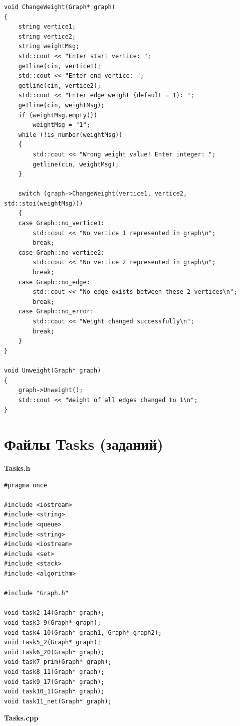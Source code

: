 \documentclass[otchet]{SCWorks}
\begin{document}
\begin{verbatim}
void ChangeWeight(Graph* graph)
{
	string vertice1;
	string vertice2;
	string weightMsg;
	std::cout << "Enter start vertice: ";
	getline(cin, vertice1);
	std::cout << "Enter end vertice: ";
	getline(cin, vertice2);
	std::cout << "Enter edge weight (default = 1): ";
	getline(cin, weightMsg);
	if (weightMsg.empty())
		weightMsg = "1";
	while (!is_number(weightMsg))
	{
		std::cout << "Wrong weight value! Enter integer: ";
		getline(cin, weightMsg);
	}

	switch (graph->ChangeWeight(vertice1, vertice2, std::stoi(weightMsg)))
	{
	case Graph::no_vertice1:
		std::cout << "No vertice 1 represented in graph\n";
		break;
	case Graph::no_vertice2:
		std::cout << "No vertice 2 represented in graph\n";
		break;
	case Graph::no_edge:
		std::cout << "No edge exists between these 2 vertices\n";
		break;
	case Graph::no_error:
		std::cout << "Weight changed successfully\n";
		break;
	}
}

void Unweight(Graph* graph)
{
	graph->Unweight();
	std::cout << "Weight of all edges changed to 1\n";
}
\end{verbatim}

\section{Файлы Tasks (заданий)}
\label{Tasks}

\textbf{Tasks.h}

\begin{verbatim}
#pragma once

#include <iostream>
#include <string>
#include <queue>
#include <string>
#include <iostream>
#include <set>
#include <stack>
#include <algorithm>

#include "Graph.h"

void task2_14(Graph* graph);
void task3_9(Graph* graph);
void task4_10(Graph* graph1, Graph* graph2);
void task5_2(Graph* graph);
void task6_20(Graph* graph);
void task7_prim(Graph* graph);
void task8_11(Graph* graph);
void task9_17(Graph* graph);
void task10_1(Graph* graph);
void task11_net(Graph* graph);
\end{verbatim}

\textbf{Tasks.cpp}
\end{document}
